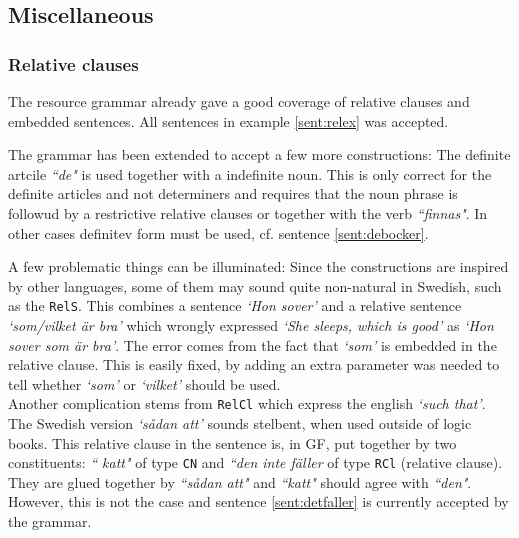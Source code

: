 \documentclass{report}
\begin{document}
\subsection{Miscellaneous}
\subsubsection{Relative clauses}
The resource grammar already gave a good coverage of relative clauses and embedded sentences.
All sentences in example \ref{sent:relex} was accepted.
\label{sent:relex} %

The grammar has been extended to accept a few more constructions:
The definite artcile \emph{``de"} is used together with a indefinite
noun. This is only correct for the definite articles and not determiners
and requires that the noun phrase is followud by a restrictive
relative clauses or together with the verb \emph{``finnas"}.
In other cases definitev form must be used, cf. sentence \ref{sent:debocker}.
\label{sent:debocker}

A few problematic things can be illuminated:
Since the constructions are inspired by other languages, some of them may sound quite
non-natural in Swedish, such as the \verb|RelS|. This combines a sentence \emph{`Hon sover'}
and a relative sentence \emph{`som/vilket är bra'} which wrongly expressed 
\emph{`She sleeps, which is good'} as
\emph{`Hon sover som är bra'}. The error comes from the fact that \emph{`som'} is
embedded in the relative clause. This is easily fixed, by adding an extra
parameter was needed to tell whether \emph{`som'} or \emph{`vilket'} should be used. \\
Another complication stems from \verb|RelCl| which express the english \emph{`such that'}.
The Swedish version \emph{`sådan att'} sounds stelbent, when used outside of logic books.
This relative clause in the sentence is, in GF, put together by two constituents: \emph{`` katt"}
of type \verb-CN- and \emph{``den inte fäller} of type \verb-RCl- (relative clause). They are
glued together by \emph{``sådan att"} and \emph{``katt"} should agree with \emph{``den"}. 
 \label{sent:detfaller}
However, this is not the case and sentence \ref{sent:detfaller} is currently
accepted by the grammar.
\end{document}
